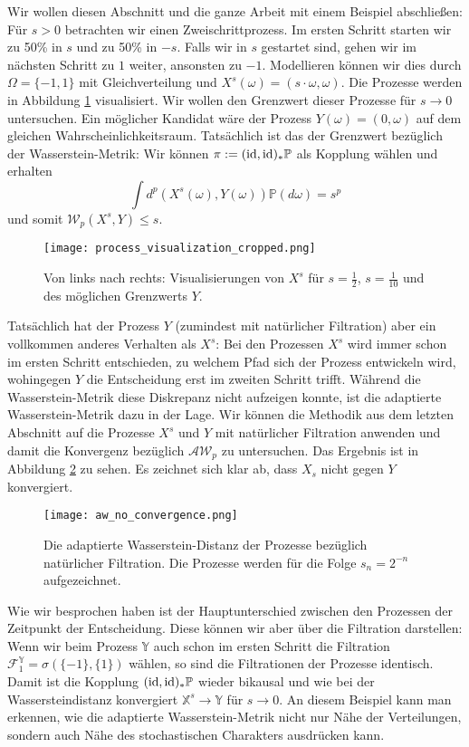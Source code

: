 Wir wollen diesen Abschnitt und die ganze Arbeit mit einem Beispiel abschließen: Für $s>0$ betrachten wir einen Zweischrittprozess. Im ersten Schritt starten wir zu 50\% in $s$ und zu 50\% in $-s$. Falls wir in $s$ gestartet sind, gehen wir im nächsten Schritt zu $1$ weiter, ansonsten zu $-1$. Modellieren können wir dies durch $\Omega = \{-1, 1\}$ mit Gleichverteilung und $X^s(\omega) = (s\cdot\omega, \omega)$. Die Prozesse werden in Abbildung \ref{fig:1} visualisiert. Wir wollen den Grenzwert dieser Prozesse für $s \rightarrow 0$ untersuchen. Ein möglicher Kandidat wäre der Prozess $Y(\omega) = (0, \omega)$ auf dem gleichen Wahrscheinlichkeitsraum. Tatsächlich ist das der Grenzwert bezüglich der Wasserstein-Metrik: Wir können $\pi := (\operatorname{id}, \operatorname{id})_*\mathbb{P}$ als Kopplung wählen und erhalten 
$$\int d^p(X^s(\omega), Y(\omega)) \mathbb{P}(d\omega) = s^p$$
und somit $\mathcal{W}_p(X^s, Y) \leq s$.
\begin{figure}[h]
    \caption{Von links nach rechts: Visualisierungen von $X^s$ für $s=\frac{1}{2}$, $s=\frac{1}{10}$ und des möglichen Grenzwerts $Y$.}
    \centering
    \texttt{[image: process\_visualization\_cropped.png]}
    \label{fig:1}
\end{figure}
Tatsächlich hat der Prozess $Y$ (zumindest mit natürlicher Filtration) aber ein vollkommen anderes Verhalten als $X^s$: Bei den Prozessen $X^s$ wird immer schon im ersten Schritt entschieden, zu welchem Pfad sich der Prozess entwickeln wird, wohingegen $Y$ die Entscheidung erst im zweiten Schritt trifft. Während die Wasserstein-Metrik diese Diskrepanz nicht aufzeigen konnte, ist die adaptierte Wasserstein-Metrik dazu in der Lage. Wir können die Methodik aus dem letzten Abschnitt auf die Prozesse $X^s$ und $Y$ mit natürlicher Filtration anwenden und damit die Konvergenz bezüglich $\mathcal{AW}_p$ zu untersuchen. Das Ergebnis ist in Abbildung \ref{fig:0} zu sehen. Es zeichnet sich klar ab, dass $X_s$ nicht gegen $Y$ konvergiert.
\begin{figure}[h]
    \caption{Die adaptierte Wasserstein-Distanz der Prozesse bezüglich natürlicher Filtration. Die Prozesse werden für die Folge $s_n = 2^{-n}$ aufgezeichnet.}
    \centering
    \texttt{[image: aw\_no\_convergence.png]}
    \label{fig:0}
\end{figure}

Wie wir besprochen haben ist der Hauptunterschied zwischen den Prozessen der Zeitpunkt der Entscheidung. Diese können wir aber über die Filtration darstellen: Wenn wir beim Prozess $\mathbb{Y}$ auch schon im ersten Schritt die Filtration $\mathcal{F}_1^\mathbb{Y} = \sigma(\{-1\}, \{1\})$ wählen, so sind die Filtrationen der Prozesse identisch. Damit ist die Kopplung $(\operatorname{id}, \operatorname{id})_* \mathbb{P}$ wieder bikausal und wie bei der Wassersteindistanz konvergiert $\mathbb{X}^s \rightarrow \mathbb{Y}$ für $s \rightarrow 0$. An diesem Beispiel kann man erkennen, wie die adaptierte Wasserstein-Metrik nicht nur Nähe der Verteilungen, sondern auch Nähe des stochastischen Charakters ausdrücken kann.
